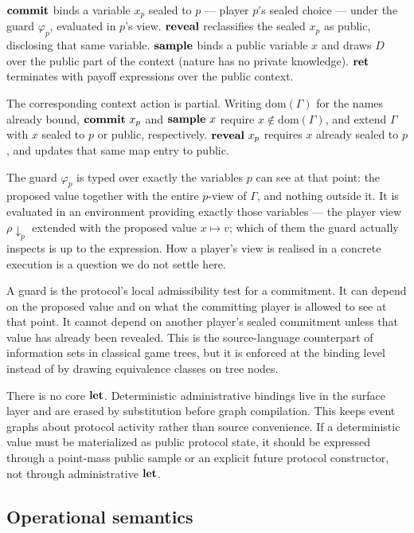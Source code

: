 \(\mathbf{commit}\) binds a variable \(x_p\) sealed to \(p\) --- player \(p\)'s
sealed choice --- under the guard \(\varphi_p\), evaluated in \(p\)'s
view. \(\mathbf{reveal}\) reclassifies the sealed \(x_p\) as public, disclosing
that same variable. \(\mathbf{sample}\) binds a public variable \(x\) and draws
\(D\) over the public part of the context (nature has no private
knowledge). \(\mathbf{ret}\) terminates with payoff expressions over the public
context.

The corresponding context action is partial.  Writing
\(\mathrm{dom}(\Gamma)\) for the names already bound, \(\mathbf{commit}~x_p\) and
\(\mathbf{sample}~x\) require \(x \notin \mathrm{dom}(\Gamma)\), and extend
\(\Gamma\) with \(x\) sealed to \(p\) or public, respectively.
\(\mathbf{reveal}~x_p\) requires \(x\) already sealed to \(p\), and updates that
same map entry to public.

The guard \(\varphi_p\) is typed over exactly the variables \(p\) can see
at that point: the proposed value together with the entire \(p\)-view of
\(\Gamma\), and nothing outside it.  It is evaluated in an environment
providing exactly those variables --- the player view
\(\rho\!\downarrow_p\) extended with the proposed value \(x \mapsto v\);
which of them the guard actually inspects is up to the expression.  How a
player's view is realised in a concrete execution is a question we do not
settle here.

A guard is the protocol's local admissibility test for a commitment.  It
can depend on the proposed value and on what the committing player is
allowed to see at that point.  It cannot depend on another player's
sealed commitment unless that value has already been revealed.  This is
the source-language counterpart of information sets in classical game
trees, but it is enforced at the binding level instead of by drawing
equivalence classes on tree nodes.

There is no core \(\mathbf{let}\).  Deterministic administrative bindings live
in the surface layer and are erased by substitution before graph
compilation.  This keeps event graphs about protocol activity rather
than source convenience.  If a deterministic value must be materialized
as public protocol state, it should be expressed through a point-mass
public sample or an explicit future protocol constructor, not through
administrative \(\mathbf{let}\).

\subsection{Operational semantics}
\label{sec:source:sos}

